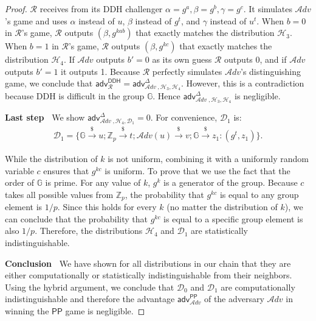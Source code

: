 \documentclass[letterpaper,twocolumn,10pt]{article}
\newcommand{\alg}[1]{\mathsf{#1}}
\newcommand{\adv}{\mathcal{A}dv}
\newcommand{\riar}{\xrightarrow{\$}}
\newcommand{\ZZ}{\mathbb{Z}}
\newcommand{\GG}{\mathbb{G}}
\newcommand{\DD}{\mathcal{D}}
\newcommand{\HH}{\mathcal{H}}
\newcommand{\RR}{\mathcal{R}}
\newcommand{\advantage}[2]{\alg{adv}^{#1}_{\adv\;\!,#2}}
\newcommand{\mypara}[1]{\vspace{.5em}\noindent\textbf{{#1}~}}
\begin{document}
\begin{appendices}
\begin{proof}
  $\RR$ receives from its DDH challenger
  $\alpha = g^a, \beta = g^b, \gamma = g^c$.
  It simulates $\adv$'s game and uses $\alpha$ instead
  of $u$, $\beta$ instead of $g^t$, and $\gamma$ instead of
  $u^{t}$.
%
  When $b = 0$ in $\RR$'s game, $\RR$ outputs $(\beta, g^{kab})$ that exactly matches the distribution $\HH_3$.
  When $b = 1$ in $\RR$'s game, $\RR$ outputs $(\beta, g^{kc})$ that exactly matches the distribution $\HH_4$.
  If $\adv$ outputs $b' = 0$ as its own guess $\RR$ outputs 0, and if $\adv$ outputs $b' = 1$ it outputs 1.
%
  Because $\RR$ perfectly simulates $\adv$'s distinguishing game, we
  conclude that
  $\alg{adv}^{\mathsf{DDH}}_{\RR} = \advantage{\Delta}{\HH_3, \HH_4}$.
  However, this is a contradiction because DDH is difficult in the
  group $\GG$. Hence $\advantage{\Delta}{\HH_3, \HH_4}$ is
  negligible.

  \mypara{Last step} We show
  $\advantage{\Delta}{\HH_4, \DD_1} = 0$. For convenience,
  $\DD_1$ is:
  \begin{equation}
    \begin{split}
      \DD_1 = \{ \GG \riar u; \ZZ_p \riar t; \adv(u) \riar v;
                 \GG \riar z_1 : (g^t, z_1) \}.
    \end{split}
  \end{equation}

  While the distribution of $k$ is not uniform, combining it with a
  uniformly random variable $c$ ensures that $g^{kc}$ is uniform. To
  prove that we use the fact that the order of $\GG$ is prime. For any
  value of $k$, $g^k$ is a generator of the group. Because $c$ takes
  all possible values from $\ZZ_p$, the probability that $g^{kc}$ is
  equal to any group element is $1 / p$. Since this holds for
  every $k$ (no matter the distribution of $k$), we can conclude that
  the probability that $g^{kc}$ is equal to a specific group element
  is also $1 / p$. Therefore, the distributions $\HH_4$ and $\DD_1$
  are statistically indistinguishable.

  \mypara{Conclusion} We have shown for all distributions in our chain
  that they are either computationally or statistically
  indistinguishable from their neighbors. Using the hybrid argument,
  we conclude that $\DD_0$ and $\DD_1$ are computationally
  indistinguishable and therefore the advantage
  $\mathsf{adv}^{\mathsf{PP}}_{\adv}$ of the adversary $\adv$ in
  winning the $\mathsf{PP}$ game is negligible.
\end{proof}


\end{appendices}
\end{document}
